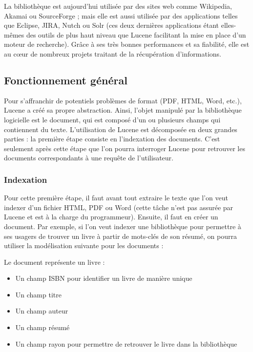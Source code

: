 La bibliothèque est aujourd’hui utilisée par des sites web comme Wikipedia, Akamai ou SourceForge ; mais elle est aussi utilisée par des applications telles que Eclipse, JIRA, Nutch ou Solr (ces deux dernières applications étant elles-mêmes des outils de plus haut niveau que Lucene facilitant la mise en place d’un moteur de recherche). Grâce à ses très bonnes performances et sa fiabilité, elle est au cœur de nombreux projets traitant de la récupération d’informations.

\subsection{Fonctionnement général}

Pour s’affranchir de potentiels problèmes de format (PDF, HTML, Word, etc.), Lucene a créé sa propre abstraction. Ainsi, l’objet manipulé par la bibliothèque logicielle est le document, qui est composé d’un ou plusieurs champs qui contiennent du texte.
L’utilisation de Lucene est décomposée en deux grandes parties : la première étape consiste en l’indexation des documents. C’est seulement après cette étape que l’on pourra interroger Lucene pour retrouver les documents correspondants à une requête de l’utilisateur.

\subsubsection{Indexation}

Pour cette première étape, il faut avant tout extraire le texte que l’on veut indexer d’un fichier HTML, PDF ou Word (cette tâche n’est pas assurée par Lucene et est à la charge du programmeur). Ensuite, il faut en créer un document. Par exemple, si l’on veut indexer une bibliothèque pour permettre à ses usagers de trouver un livre à partir de mots-clés de son résumé, on pourra utiliser la modélisation suivante pour les documents :

Le document représente un livre :
\begin{itemize}
  \item Un champ ISBN pour identifier un livre de manière unique
  \item Un champ titre
  \item Un champ auteur
  \item Un champ résumé
  \item Un champ rayon pour permettre de retrouver le livre dans la bibliothèque
\end{itemize}

